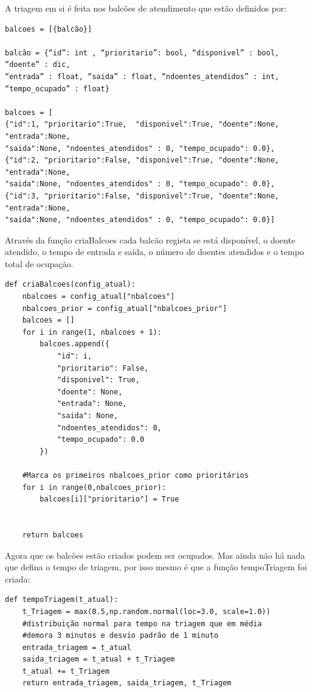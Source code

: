 \documentclass[12pt,a4paper]{article} %
\begin{document}
     \medskip
    A triagem em si é feita nos balcões de atendimento que estão definidos por:
\begin{verbatim}
balcoes = [{balcão}]
    
balcão = {“id”: int , “prioritario”: bool, “disponivel” : bool, “doente” : dic,
“entrada” : float, “saida” : float, “ndoentes_atendidos” : int, 
“tempo_ocupado” : float}

balcoes = [
{"id":1, "prioritario":True,  "disponivel":True, "doente":None, "entrada":None, 
"saida":None, "ndoentes_atendidos" : 0, "tempo_ocupado": 0.0},
{"id":2, "prioritario":False, "disponivel":True, "doente":None, "entrada":None, 
"saida":None, "ndoentes_atendidos" : 0, "tempo_ocupado": 0.0},
{"id":3, "prioritario":False, "disponivel":True, "doente":None, "entrada":None, 
"saida":None, "ndoentes_atendidos" : 0, "tempo_ocupado": 0.0}]
\end{verbatim}

    Através da função criaBalcoes cada balcão regista se está disponível, o doente atendido, o tempo de entrada e saída, o número de doentes atendidos e o tempo total de ocupação.

\begin{verbatim}
def criaBalcoes(config_atual):
    nbalcoes = config_atual["nbalcoes"]
    nbalcoes_prior = config_atual["nbalcoes_prior"]
    balcoes = []
    for i in range(1, nbalcoes + 1):
        balcoes.append({
            "id": i,
            "prioritario": False,
            "disponivel": True,
            "doente": None,
            "entrada": None,
            "saida": None,
            "ndoentes_atendidos": 0,
            "tempo_ocupado": 0.0
        })

    #Marca os primeiros nbalcoes_prior como prioritários
    for i in range(0,nbalcoes_prior):
        balcoes[i]["prioritario"] = True


    return balcoes
\end{verbatim}
    \medskip
    Agora que os balcões estão criados podem ser ocupados. Mas ainda não há nada que defina o tempo de triagem, por isso mesmo é que a função tempoTriagem foi criada:
\begin{verbatim}
def tempoTriagem(t_atual):
    t_Triagem = max(0.5,np.random.normal(loc=3.0, scale=1.0))  
    #distribuição normal para tempo na triagem que em média 
    #demora 3 minutos e desvio padrão de 1 minuto
    entrada_triagem = t_atual
    saida_triagem = t_atual + t_Triagem
    t_atual += t_Triagem
    return entrada_triagem, saida_triagem, t_Triagem
\end{verbatim}
\end{document}
